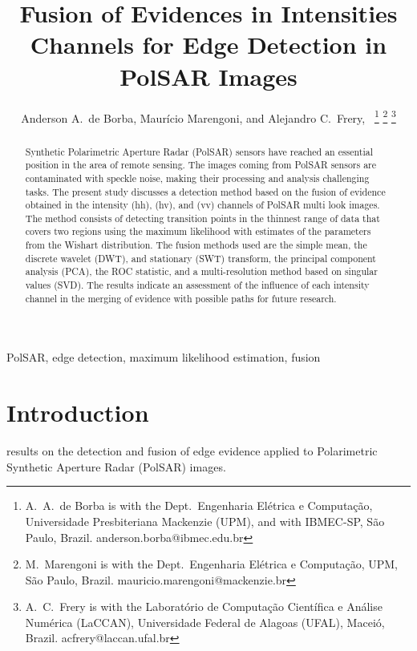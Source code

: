 \documentclass[journal]{IEEEtran}
\begin{document}
\title{Fusion of Evidences in Intensities Channels for Edge Detection in PolSAR Images}
\author{Anderson A.\ de Borba, Maurício Marengoni, and Alejandro C.\ Frery,~%
\thanks{A.\ A.\ de Borba is with the Dept.\ Engenharia Elétrica e Computação, Universidade Presbiteriana Mackenzie (UPM), and with IBMEC-SP, São Paulo, Brazil. anderson.borba@ibmec.edu.br}
\thanks{M.\ Marengoni is with the Dept.\ Engenharia Elétrica e Computação,
UPM, São Paulo, Brazil. mauricio.marengoni@mackenzie.br}
\thanks{A.\ C.\ Frery is with the Laboratório de Computação Científica e Análise Numérica (LaCCAN), Universidade Federal de Alagoas (UFAL), Maceió, Brazil. acfrery@laccan.ufal.br}}

\maketitle

\begin{abstract}
Synthetic Polarimetric Aperture Radar (PolSAR) sensors have reached an essential position in the area of remote sensing. 
The images coming from PolSAR sensors are contaminated with speckle noise, making their processing and analysis challenging tasks. 
The present study discusses a detection method based on the fusion of evidence obtained in the intensity (hh), (hv), and (vv) channels of PolSAR multi look images. 
The method consists of detecting transition points in the thinnest range of data that covers two regions using the maximum likelihood with estimates of the parameters from the Wishart distribution. 
The fusion methods used are the simple mean, the discrete wavelet (DWT), and stationary (SWT) transform, the principal component analysis (PCA), the ROC statistic, and a multi-resolution method based on singular values (SVD). 
The results indicate an assessment of the influence of each intensity channel in the merging of evidence with possible paths for future research.
\end{abstract}

\begin{IEEEkeywords}
PolSAR, edge detection, maximum likelihood estimation, fusion
\end{IEEEkeywords}

\section{Introduction}\label{sec_01}

results on the detection and fusion of edge evidence applied to Polarimetric Synthetic Aperture Radar (PolSAR) images.
\end{document}
